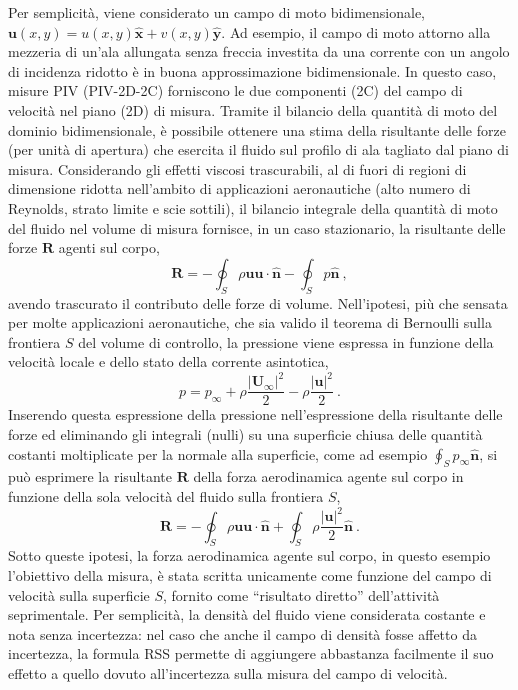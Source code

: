 \noindent
 Per semplicità, viene considerato un campo di moto bidimensionale, $\bm{u}(x,y)=u(x,y)\bm{\hat{x}}+v(x,y)\bm{\hat{y}}$. Ad esempio, il campo di moto attorno alla mezzeria di un'ala allungata senza freccia investita da una corrente con un angolo di incidenza ridotto è in buona approssimazione bidimensionale.
 In questo caso, misure PIV (PIV-2D-2C) forniscono le due componenti (2C) del campo di velocità nel piano (2D) di misura. Tramite il bilancio della quantità di moto del dominio bidimensionale, è possibile ottenere una stima della risultante delle forze (per unità di apertura) che esercita il fluido sul profilo di ala tagliato dal piano di misura.
Considerando gli effetti viscosi trascurabili, al di fuori di regioni di dimensione ridotta nell'ambito di applicazioni aeronautiche (alto numero di Reynolds, strato limite e scie sottili), il bilancio integrale della quantità di moto del fluido nel volume di misura fornisce, in un caso stazionario, la risultante delle forze ${\bm{R}}$ agenti sul corpo, 
\begin{equation}
 \bm{R} = -\oint_S \rho \bm{u} \bm{u} \cdot \bm{\hat{n}} - \oint_S p \bm{\hat{n}} \ ,
\end{equation}
avendo trascurato il contributo delle forze di volume.
%
Nell'ipotesi, più che sensata per molte applicazioni aeronautiche, che sia valido il teorema di Bernoulli sulla frontiera $S$ del volume di controllo, la pressione viene espressa in funzione della velocità locale e dello stato della corrente asintotica,
\begin{equation}
 p = p_\infty + \rho \dfrac{|\bm{U_\infty}|^2}{2} - \rho \dfrac{|\bm{u}|^2}{2} \ .
\end{equation}
Inserendo questa espressione della pressione nell'espressione della risultante delle forze ed eliminando gli integrali (nulli) su una superficie chiusa delle quantità costanti moltiplicate per la normale alla superficie, come ad esempio $\oint_S p_\infty \bm{\hat{n}}$, si può esprimere la risultante $\bm{R}$ della forza aerodinamica agente sul corpo in funzione della sola velocità del fluido sulla frontiera $S$,
\begin{equation}
 \bm{R} = -\oint_S \rho \bm{u} \bm{u} \cdot \bm{\hat{n}} + \oint_S \rho \dfrac{|\bm{u}|^2}{2} \bm{\hat{n}} \ .
\end{equation}
Sotto queste ipotesi, la forza aerodinamica agente sul corpo, in questo esempio l'obiettivo della misura, è stata scritta unicamente come funzione del campo di velocità sulla superficie $S$, fornito come ``risultato diretto'' dell'attività seprimentale. Per semplicità, la densità del fluido viene considerata costante e nota senza incertezza: nel caso che anche il campo di densità fosse affetto da incertezza, la formula RSS permette di aggiungere abbastanza facilmente il suo effetto a quello dovuto all'incertezza sulla misura del campo di velocità.
\newline
